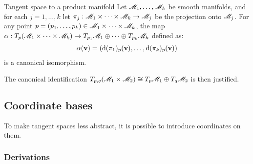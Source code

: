 \begin{proposition}{Tangent space to a product manifold}{}
  Let $ \mathscr{M}_1 , \dots , \mathscr{M}_k $ be smooth manifolds, and for each $ j = 1 , \dots , k $ let $ \pi_j : \mathscr{M}_1 \times \dots \times \mathscr{M}_k \rightarrow \mathscr{M}_j $ be the projection onto $ \mathscr{M}_j $. For any point $ p = (p_1 , \dots , p_k) \in \mathscr{M}_1 \times \dots \times \mathscr{M}_k $, the map $ \alpha : T_p(\mathscr{M}_1 \times \dots \times \mathscr{M}_k) \rightarrow T_{p_1}\mathscr{M}_1 \oplus \dots \oplus T_{p_k}\mathscr{M}_k $ defined as:
  \begin{equation*}
    \alpha(\mathbf{v}) = (\mathrm{d} (\pi_1)_p(\mathbf{v}) , \dots , \mathrm{d} (\pi_k)_p(\mathbf{v}))
  \end{equation*}
  is a canonical isomorphism.
\end{proposition}

The canonical identification $ T_{p,q}(\mathscr{M}_1 \times \mathscr{M}_2) \cong T_p\mathscr{M}_1 \oplus T_q\mathscr{M}_2 $ is then justified.

\subsection{Coordinate bases}

To make tangent spaces less abstract, it is possible to introduce coordinates on them.

\subsubsection{Derivations}

